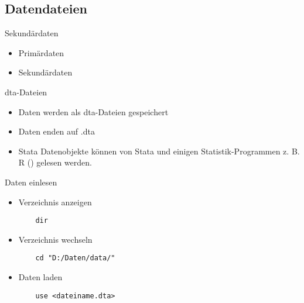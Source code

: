 \subsection{Datendateien}
\begin{frame}{Sekundärdaten}
 \begin{itemize}
  \item Primärdaten
  \item Sekundärdaten
 \end{itemize}


\end{frame}

\begin{frame}{dta-Dateien}
  \begin{itemize}
  \item Daten werden als dta-Dateien gespeichert
  \item Daten enden auf .dta
  \item Stata Datenobjekte können von Stata und einigen Statistik-Programmen z. B. R (\cite{R13}) gelesen werden.
  \end{itemize}
\end{frame}

\begin{frame}[fragile]{Daten einlesen}
  \begin{itemize}
    \item Verzeichnis anzeigen 
    \begin{lstlisting}
    dir
    \end{lstlisting}
    \item Verzeichnis wechseln 
    \begin{lstlisting}
    cd "D:/Daten/data/"
    \end{lstlisting}
    \item Daten laden  
    \begin{lstlisting}
    use <dateiname.dta>
    \end{lstlisting}
  \end{itemize}
  
  
\end{frame}

